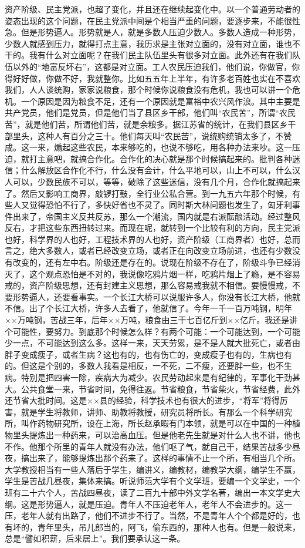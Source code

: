 资产阶级、民主党派，也超了变化，并且还在继续起变化中。以一个普通劳动者的姿态出现的这个问题，在民主党派中间是个相当严重的问题，要逐步来，不能很性急。但是形势逼人。形势就是人，就是多数人压迫少数人。多数人造成一种形势，少数人就感到压力，就得打点主意，我历求是主张对立面的，没有对立面，谁也不干的。我有什么对立面呢？在我们民主队伍里头有很多对立面。此外还有在我们队伍以外的“地富反坏右”，这都是对立面。工人农民压迫我们，他们说，你做官，你得好好做，你做不好，我就整你。比如五五年上半年，有许多老百姓也实在不喜欢我们，人人谈统购，家家说粮食，那个时候你说粮食没有危机，我也可以讲一个危机。一个原因是因为粮食不足，还有一个原因就是富裕中农兴风作浪。其中主要是共产党员，他们是党员，但是他们当了县区乡干部，他们叫“农民苦”，所谓“农民苦”，就是他们苦，所谓他们苦，就是余粮多。据江苏省的统计，在我们县区乡干部里头，这种人有百分之三十。他们每天叫“农民苦”，说统购统销太多了，不赞成。这一来，煽起这些农民，本来够吃的，也说不够吃，用各种办法来吵。这一压迫，就打主意吧，就搞合作化。合作化的决心就是那个时候搞起来的。批判各种迷信；什么解放区合作化不行，什么没有会计，什么平地可以，山上不可以，什么汉人可以，少数民族不可以，等等，破除了这些迷信，没有几个月，合作化就搞起来了。然后又影响工商界，敲锣打鼓，全行业公私合营。到一九五六年那个时候，有些人又觉得恐怕不行了，多快好省也不灵了。同时斯大林问题也发生了，匈牙利事件出来了，帝国主义反共反苏，那么一个潮流，国内就是右派酝酿活动。经过整风反右，才把这些东西扭转过来。而现在呢，就转到一个比较有利的方向，民主党派也好，科学界的人也好，工程技术界的人也好，资产阶级（工商界者）也好，总而言之，绝大多数人，或者已经改变立场，或者正在向改变立场前进，也还有少数没有改变的，还有左中右。阶级还是存在的。说现在阶级不存在了，阶级斗争已经消灭了，这个观点恐怕是不对的，我说像吃鸦片烟一样，吃鸦片烟上了瘾，是不容易戒的，资产阶级思想，还有封建主义思想，那么容易戒我就不相信。要慢慢戒，不要形势逼人，还要看事实。一个长江大桥可以说服许多人，你没有长江大桥，他就不信。出了个长江大桥，许多人去看了，他就信了。今年一千一百万吨钢，明年××万吨钢，苦战三年，后年××万吨，粮食由三干七百亿斤到××亿斤。我还是讲个可能性，要努力。到底那个时候怎么样？有两个可能：一个可能达到，一个可能少一点，不可能达到这么多。这样一来，天天劳累，是不是人就大批死亡，或者由胖子变成瘦子，或者生病？这也有的，也有伤亡的，变成瘦子也有的，生病也有的。但这是个别的，多数人我看是相反，一不死，二不瘦，还要胖一些，也不生病。特别是把四害一除，疾病大为减少。农民劳动起来是有纪律的，军事化干劲甚大。公共食堂一来，节省时间，免得往返。节省粮食，节省柴火，节省经费，此外还节省大批时间。这是××县的经验，科学技术也有很大的进步，“将军”将得厉害，就是学生将教师，讲师、助教将教授，研究员将所长。有那么一个科学研究所，叫作药物研究所，设在上海，所长赵承暇有门本领，就是可以在中国的一种植物里头提炼出一种药来，可以治高血压。但是他老先生就是对什么人也不讲，他也不作。他那个所里的青年人就没有办法，他们呕了气，就自己干，结果苦战多少昼夜，搞出来了，能够提炼出那个药来了。这样的事情不止一个所，有相当几个所。大学教授相当有一些人落后于学生，编讲义，编教材，编教学大纲，编学生不赢，学生是苦战几昼夜，集体来搞。听说师范大学有个文学班，要编一个文学史，一个班有二十六个人，苦战四昼夜，读了二百九十部中外文学名著，编出一本文学史大纲。这是形势逼人，就是压迫。青年人不压迫老年人，老年人不会进步的。这一压，老年人就有出路了，他们不进步不行了。当然，不是青年人个个都是好的，也有坏的，青年里头，吊儿郎当的，阿飞，偷东西的，那种人也有。但是一般说来，总是“譬如积薪，后来居上”。我们要承认这一条。

